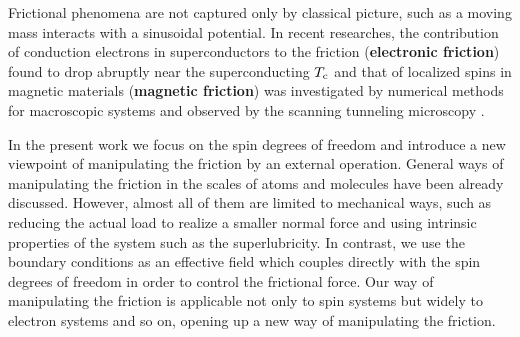 Frictional phenomena are not captured only by classical picture, such as a moving mass interacts with a sinusoidal potential. In recent researches, the contribution of conduction electrons in superconductors to the friction (\textbf{electronic friction}) found to drop abruptly near the superconducting $T_{\rm c}$ \cite{Dayo1998,Novotny1999,Qi2008} and that of localized spins in magnetic materials (\textbf{magnetic friction}) was investigated by numerical methods for macroscopic systems \cite{Kadau2008,Fusco2008,Magiera2011} and observed by the scanning tunneling microscopy \cite{Wolter2012}.


In the present work we focus on the spin degrees of freedom and introduce a new viewpoint of manipulating the friction by an external operation. General ways of manipulating the friction in the scales of atoms and molecules have been already discussed. However, almost all of them are limited to mechanical ways, such as reducing the actual load to realize a smaller normal force and using intrinsic properties of the system such as the superlubricity. In contrast, we use the boundary conditions as an effective field which couples directly with the spin degrees of freedom in order to control the frictional force. Our way of manipulating the friction is applicable not only to spin systems but widely to electron systems and so on, opening up a new way of manipulating the friction.


